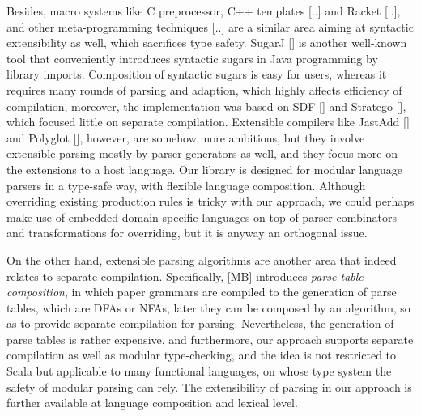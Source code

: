 Besides, macro systems like C preprocessor, C++ templates [..] and Racket [..], and other meta-programming techniques [..] are a similar area aiming at syntactic extensibility as well, which sacrifices type safety. SugarJ [] is another well-known tool that conveniently introduces syntactic sugars in Java programming by library imports. Composition of syntactic sugars is easy for users, whereas it requires many rounds of parsing and adaption, which highly affects efficiency of compilation, moreover, the implementation was based on SDF [] and Stratego [], which focused little on separate compilation. Extensible compilers like JastAdd [] and Polyglot [], however, are somehow more ambitious, but they involve extensible parsing mostly by parser generators as well, and they focus more on the extensions to a host language. Our library is designed for modular language parsers in a type-safe way, with flexible language composition. Although overriding existing production rules is tricky with our approach, we could perhaps make use of embedded domain-specific languages on top of parser combinators and transformations for overriding, but it is anyway an orthogonal issue.      

On the other hand, extensible parsing algorithms are another area that indeed relates to separate compilation. Specifically, [MB] introduces \textit{parse table composition}, in which paper grammars are compiled to the generation of parse tables, which are DFAs or NFAs, later they can be composed by an algorithm, so as to provide separate compilation for parsing. Nevertheless, the generation of parse tables is rather expensive, and furthermore, our approach supports separate compilation as well as modular type-checking, and the idea is not restricted to Scala but applicable to many functional languages, on whose type system the safety of modular parsing can rely. The extensibility of parsing in our approach is further available at language composition and lexical level.

